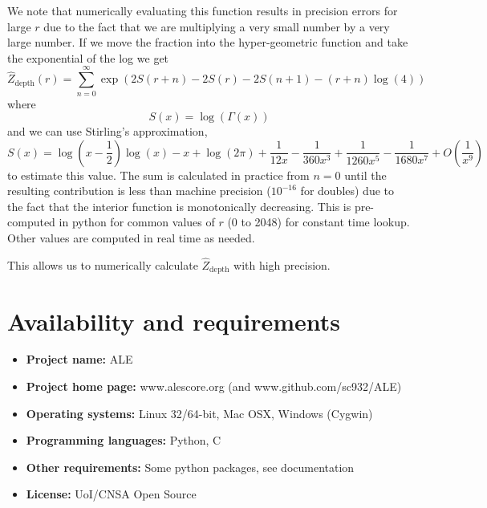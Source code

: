 \documentclass[phd,tocprelim]{cornell}
\begin{document}
We note that numerically evaluating this function results in precision errors for large $r$ due to the fact that we are multiplying a very small number by a very large number. If we move the fraction into the hyper-geometric function and take the exponential of the log we get
\begin{equation}
    \hat{Z}_{\text{depth}}(r) = \sum_{n=0}^{\infty} \exp\left(2S(r+n) - 2S(r) - 2S(n+1) - (r+n)\log(4)\right)
\end{equation}
where
\begin{equation}
    S(x) = \log\left(\Gamma(x)\right)
\end{equation}
and we can use Stirling's approximation,
\begin{equation}
    S(x) = \log\left(x - \frac{1}{2}\right)\log(x) - x + \log(2\pi) + \frac{1}{12x} - \frac{1}{360x^{3}} + \frac{1}{1260x^{5}} - \frac{1}{1680x^{7}} + O\left(\frac{1}{x^{9}}\right)
\end{equation}
to estimate this value. The sum is calculated in practice from $n=0$ until the resulting contribution is less than machine precision ($10^{-16}$ for doubles) due to the fact that the interior function is monotonically decreasing. This is pre-computed in python for common values of $r$ (0 to 2048) for constant time lookup. Other values are computed in real time as needed.

This allows us to numerically calculate $\hat{Z}_{\text{depth}}$ with high precision.


\section{Availability and requirements}
 \begin{itemize}
  \item \textbf{Project name:} ALE
  \item \textbf{Project home page:} www.alescore.org (and www.github.com/sc932/ALE)
  \item \textbf{Operating systems:} Linux 32/64-bit, Mac OSX, Windows (Cygwin)
  \item \textbf{Programming languages:} Python, C
  \item \textbf{Other requirements:} Some python packages, see documentation
  \item \textbf{License:} UoI/CNSA Open Source
 \end{itemize}
\end{document}
